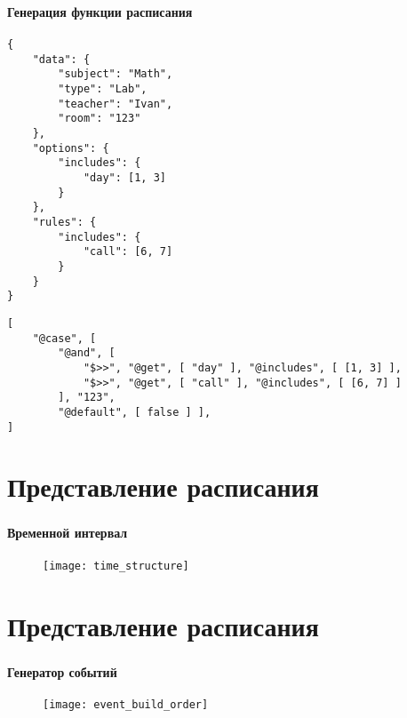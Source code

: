 \begin{frame}[fragile]
\frametitle{\insertsection}
\framesubtitle{Генерация функции расписания}

    \begin{lstlisting}[basicstyle=\tiny]
{
    "data": {
        "subject": "Math",
        "type": "Lab",
        "teacher": "Ivan",
        "room": "123"
    },
    "options": {
        "includes": {
            "day": [1, 3]
        }
    },
    "rules": {
        "includes": {
            "call": [6, 7]
        }
    }
}
    \end{lstlisting}
\endminipage\hfill
{}
    \begin{lstlisting}[basicstyle=\tiny]
[
    "@case", [
        "@and", [
            "$>>", "@get", [ "day" ], "@includes", [ [1, 3] ],
            "$>>", "@get", [ "call" ], "@includes", [ [6, 7] ]
        ], "123",
        "@default", [ false ] ],
]
    \end{lstlisting}
\endminipage

\end{frame}


\section{Представление расписания}

\begin{frame}[fragile]
\frametitle{\insertsection}
\framesubtitle{Временной интервал}

\begin{figure}
    \center
    \texttt{[image: time\_structure]}
\end{figure}
\end{frame}


\section{Представление расписания}

\begin{frame}
\frametitle{\insertsection}
\framesubtitle{Генератор событий}

\vspace{1cm}

\begin{figure}
    \center
    \texttt{[image: event\_build\_order]}
\end{figure}
\end{frame}

